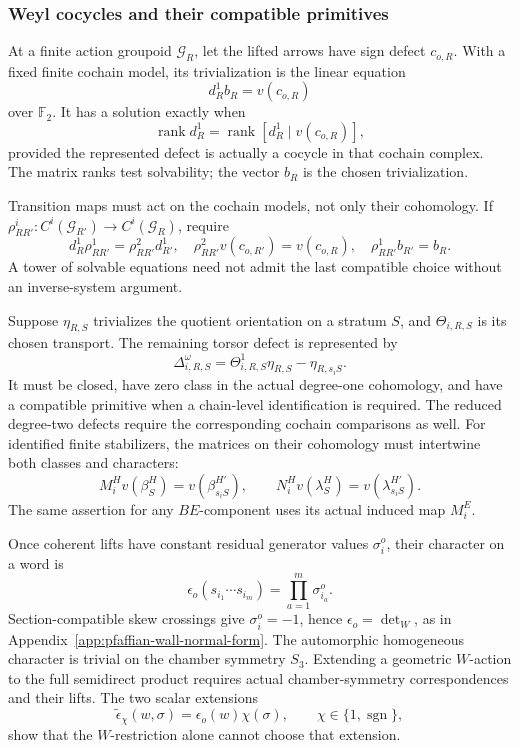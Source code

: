 \subsubsection*{Weyl cocycles and their compatible primitives}

At a finite action groupoid \(\mathcal G_R\), let the lifted
arrows have sign defect \(c_{o,R}\). With a fixed finite cochain
model, its trivialization is the linear equation
\[
 d_R^1b_R=v(c_{o,R})
\]
over \(\mathbb F_2\). It has a solution exactly when
\[
 \operatorname{rank}d_R^1
 =\operatorname{rank}[d_R^1\mid v(c_{o,R})],
\]
provided the represented defect is actually a cocycle in that
cochain complex. The matrix ranks test solvability; the vector
\(b_R\) is the chosen trivialization.

Transition maps must act on the cochain models, not only their
cohomology. If
\(\rho^i_{RR'}:C^i(\mathcal G_{R'})\to C^i(\mathcal G_R)\),
require
\[
 d_R^1\rho^1_{RR'}=\rho^2_{RR'}d_{R'}^1,
 \quad \rho^2_{RR'}v(c_{o,R'})=v(c_{o,R}),
 \quad \rho^1_{RR'}b_{R'}=b_R.
\]
A tower of solvable equations need not admit the last compatible
choice without an inverse-system argument.

Suppose \(\eta_{R,S}\) trivializes the quotient orientation on a
stratum \(S\), and \(\Theta_{i,R,S}\) is its chosen transport.
The remaining torsor defect is represented by
\[
 \Delta^\omega_{i,R,S}
 =\Theta^1_{i,R,S}\eta_{R,S}-\eta_{R,s_iS}.
\]
It must be closed, have zero class in the actual degree-one
cohomology, and have a compatible primitive when a chain-level
identification is required. The reduced degree-two defects require
the corresponding cochain comparisons as well.
For identified finite stabilizers, the matrices on their cohomology
must intertwine both classes and characters:
\[
 M_i^H v(\beta^H_S)=v(\beta^{H'}_{s_iS}),\qquad
 N_i^H v(\lambda^H_S)=v(\lambda^{H'}_{s_iS}).
\]
The same assertion for any \(BE\)-component uses its actual
induced map \(M_i^E\).

Once coherent lifts have constant residual generator values
\(\sigma_i^o\), their character on a word is
\[
 \epsilon_o(s_{i_1}\cdots s_{i_m})=
       \prod_{a=1}^m\sigma_{i_a}^o.
\]
Section-compatible skew crossings give \(\sigma_i^o=-1\), hence
\(\epsilon_o=\det_W\), as in
Appendix~\ref{app:pfaffian-wall-normal-form}.
The automorphic homogeneous character is trivial on the chamber
symmetry \(S_3\). Extending a geometric \(W\)-action to the full
semidirect product requires actual chamber-symmetry correspondences
and their lifts. The two scalar extensions
\[
 \widetilde\epsilon_\chi(w,\sigma)=\epsilon_o(w)\chi(\sigma),
 \qquad \chi\in\{1,\operatorname{sgn}\},
\]
show that the \(W\)-restriction alone cannot choose that extension.

